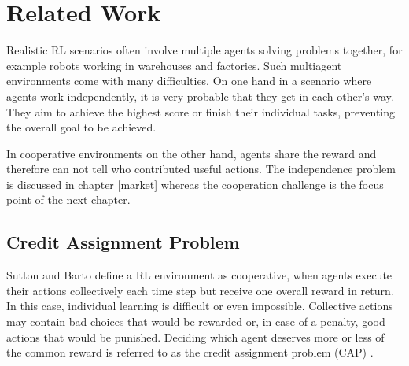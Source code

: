 %
%
\chapter{Related Work}\label{sec:RelatedWork}
Realistic RL scenarios often involve multiple agents solving problems together, for example robots working in warehouses and factories. Such multiagent environments come with many difficulties. On one hand in a scenario where agents work independently, it is very probable that they get in each other's way. They aim to achieve the highest score or finish their individual tasks, preventing the overall goal to be achieved.

In cooperative environments on the other hand, agents share the reward and therefore can not tell who contributed useful actions. 
The independence problem is discussed in chapter \ref{market} whereas the cooperation challenge is the focus point of the next chapter.

\section{Credit Assignment Problem}\label{CAP}
Sutton and Barto \cite{suba18} define a RL environment as cooperative, when agents execute their actions collectively each time step but receive one overall reward in return. In this case, individual learning is difficult or even impossible. Collective actions may contain bad choices that would be rewarded or, in case of a penalty, good actions that would be punished. Deciding which agent deserves more or less of the common reward is referred to as the credit assignment problem (CAP) \cite{mi61}.


